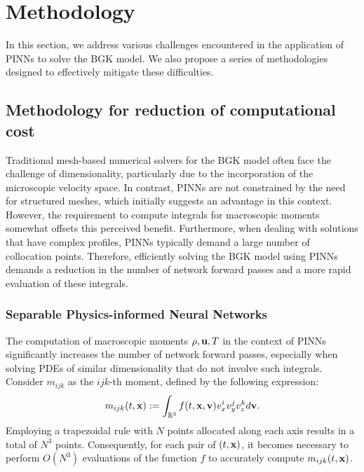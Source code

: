 \documentclass[preprint,12pt]{elsarticle}
\begin{document}
\section{Methodology}\label{sec:methodology}
In this section, we address various challenges encountered in the application of PINNs to solve the BGK model.
We also propose a series of methodologies designed to effectively mitigate these difficulties.

\subsection{Methodology for reduction of computational cost}\label{sec:reducing_computational_cost}
Traditional mesh-based numerical solvers for the BGK model often face the challenge of dimensionality, particularly due to the incorporation of the microscopic velocity space.
In contrast, PINNs are not constrained by the need for structured meshes, which initially suggests an advantage in this context.
However, the requirement to compute integrals for macroscopic moments somewhat offsets this perceived benefit.
Furthermore, when dealing with solutions that have complex profiles, PINNs typically demand a large number of collocation points.
Therefore, efficiently solving the BGK model using PINNs demands a reduction in the number of network forward passes and a more rapid evaluation of these integrals.


\subsubsection{Separable Physics-informed Neural Networks}
The computation of macroscopic moments $\rho, {\bf u}, T$ in the context of PINNs significantly increases the number of network forward passes, especially when solving PDEs of similar dimensionality that do not involve such integrals.
Consider $m_{ijk}$ as the $ijk$-th moment, defined by the following expression: 
\begin{equation}\label{eq: moments}
    m_{ijk}(t, {\bf x}) := \int_{\mathbb{R}^3} f(t,{\bf x, v}) v_x^i v_y^j v_z^k d{\bf v}.
\end{equation}
Employing a trapezoidal rule with $N$ points allocated along each axis results in a total of $N^3$ points.
Consequently, for each pair of $(t, {\bf x})$, it becomes necessary to perform $O(N^3)$ evaluations of the function $f$ to accurately compute $m_{ijk}(t, {\bf x})$.
\end{document}
